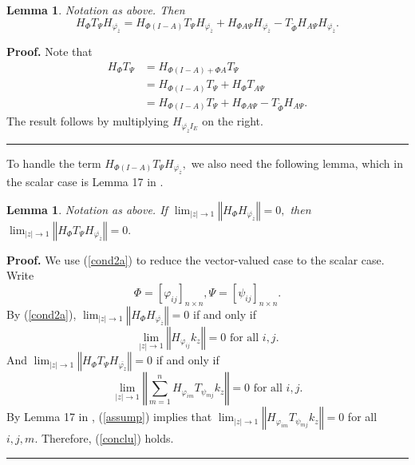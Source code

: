 \documentclass{article}%
\newtheorem{lemma}[theorem]{Lemma}
\newenvironment{proof}[1][Proof]{\noindent\textbf{#1.} }{\ \rule{0.5em}{0.5em}}
\begin{document}
\begin{lemma}
\label{lemma 3.7} Notation as above. Then
\[
H_{\Phi}T_{\Psi}H_{\overline{\varphi_{\overline{z}}}}=H_{\Phi(I-A)}T_{\Psi
}H_{\overline{\varphi_{\overline{z}}}}+H_{\Phi A\Psi}H_{\overline
{\varphi_{\overline{z}}}}-T_{\widetilde{\Phi}}H_{A\Psi}H_{\overline
{\varphi_{\overline{z}}}}.
\]

\end{lemma}

\begin{proof}
Note that%
\begin{align*}
H_{\Phi}T_{\Psi}  &  =H_{\Phi(I-A)+\Phi A}T_{\Psi}\\
&  =H_{\Phi(I-A)}T_{\Psi}+H_{\Phi}T_{A\Psi}\\
&  =H_{\Phi(I-A)}T_{\Psi}+H_{\Phi A\Psi}-T_{\widetilde{\Phi}}H_{A\Psi}.
\end{align*}
The result follows by multiplying $H_{\overline{\varphi_{\overline{z}}}I_{E}}$
on the right.
\end{proof}

To handle the term $H_{\Phi(I-A)}T_{\Psi}H_{\overline{\varphi_{\overline{z}}}%
},$ we also need the following lemma, which in the scalar case is Lemma 17 in
\cite{GuoZ1}.

\begin{lemma}
\label{lemma 3.8} Notation as above. If $\lim_{\left\vert z\right\vert
\rightarrow1}\left\Vert H_{\Phi}H_{\overline{\varphi_{\overline{z}}}%
}\right\Vert =0,$ then $\lim_{\left\vert z\right\vert \rightarrow1}\left\Vert
H_{\Phi}T_{\Psi}H_{\overline{\varphi_{\overline{z}}}}\right\Vert =0.$
\end{lemma}

\begin{proof}
We use (\ref{cond2a}) to reduce the vector-valued case to the scalar case.
Write
\[
\Phi=\left[  \varphi_{ij}\right]  _{n\times n},\Psi=\left[  \psi_{ij}\right]
_{n\times n}.
\]
By (\ref{cond2a}), $\lim_{\left\vert z\right\vert \rightarrow1}\left\Vert
H_{\Phi}H_{\overline{\varphi_{\overline{z}}}}\right\Vert =0$ if and only if
\begin{equation}
\lim_{\left\vert z\right\vert \rightarrow1}\left\Vert H_{\varphi_{ij}}%
k_{z}\right\Vert =0\text{ for all }i,j. \label{assump}%
\end{equation}
And $\lim_{\left\vert z\right\vert \rightarrow1}\left\Vert H_{\Phi}T_{\Psi
}H_{\overline{\varphi_{\overline{z}}}}\right\Vert =0$ if and only if
\begin{equation}
\lim_{\left\vert z\right\vert \rightarrow1}\left\Vert \sum_{m=1}^{n}%
H_{\varphi_{im}}T_{\psi_{mj}}k_{z}\right\Vert =0\text{ for all }i,j.
\label{conclu}%
\end{equation}
By Lemma 17 in \cite{GuoZ1}, (\ref{assump}) implies that $\lim_{\left\vert
z\right\vert \rightarrow1}\left\Vert H_{\varphi_{im}}T_{\psi_{mj}}%
k_{z}\right\Vert =0$ for all $i,j,m.$ Therefore, (\ref{conclu}) holds.
\end{proof}
\end{document}

